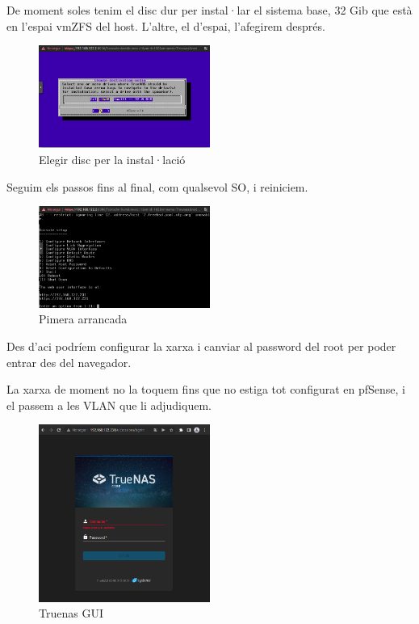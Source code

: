 \documentclass[
  10pt,
]{krantz}
\begin{document}
De moment soles tenim el disc dur per instal·lar el sistema base, 32 Gib que està en l'espai vmZFS del host. L'altre, el d'espai, l'afegirem després.

\begin{figure}
\centering
\includegraphics[width=0.5\textwidth,height=\textheight]{imatges/proxmox/truenas_in2.png}
\caption{Elegir disc per la instal·lació}
\end{figure}

Seguim els passos fins al final, com qualsevol SO, i reiniciem.

\begin{figure}
\centering
\includegraphics[width=0.5\textwidth,height=\textheight]{imatges/proxmox/truenas_arr0.png}
\caption{Pimera arrancada}
\end{figure}

Des d'aci podríem configurar la xarxa i canviar al password del root per poder entrar des del navegador.

La xarxa de moment no la toquem fins que no estiga tot configurat en pfSense, i el passem a les VLAN que li adjudiquem.

\begin{figure}
\centering
\includegraphics[width=0.5\textwidth,height=\textheight]{imatges/proxmox/trunas_ar1.png}
\caption{Truenas GUI}
\end{figure}
\end{document}
